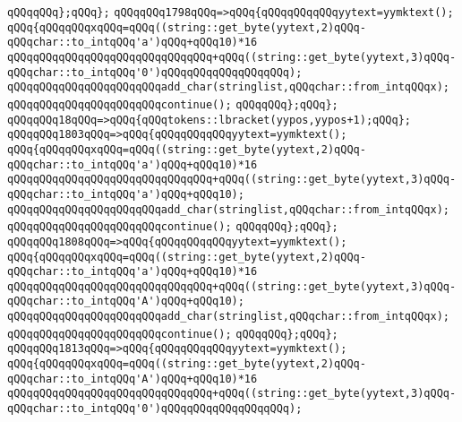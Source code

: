 \verb|qQQqqQQq};qQQq};|\newline
\verb|qQQqqQQq1798qQQq=>qQQq{qQQqqQQqqQQqyytext=yymktext();|\newline
\verb|qQQq{qQQqqQQqxqQQq=qQQq((string::get_byte(yytext,2)qQQq-qQQqchar::to_intqQQq'a')qQQq+qQQq10)*16|\newline
\verb|qQQqqQQqqQQqqQQqqQQqqQQqqQQqqQQq+qQQq((string::get_byte(yytext,3)qQQq-qQQqchar::to_intqQQq'0')qQQqqQQqqQQqqQQqqQQq);|\newline
\verb|qQQqqQQqqQQqqQQqqQQqqQQqadd_char(stringlist,qQQqchar::from_intqQQqx);|\newline
\verb|qQQqqQQqqQQqqQQqqQQqqQQqcontinue();|\newline
\verb|qQQqqQQq};qQQq};|\newline
\verb|qQQqqQQq18qQQq=>qQQq{qQQqtokens::lbracket(yypos,yypos+1);qQQq};|\newline
\verb|qQQqqQQq1803qQQq=>qQQq{qQQqqQQqqQQqyytext=yymktext();|\newline
\verb|qQQq{qQQqqQQqxqQQq=qQQq((string::get_byte(yytext,2)qQQq-qQQqchar::to_intqQQq'a')qQQq+qQQq10)*16|\newline
\verb|qQQqqQQqqQQqqQQqqQQqqQQqqQQqqQQq+qQQq((string::get_byte(yytext,3)qQQq-qQQqchar::to_intqQQq'a')qQQq+qQQq10);|\newline
\verb|qQQqqQQqqQQqqQQqqQQqqQQqadd_char(stringlist,qQQqchar::from_intqQQqx);|\newline
\verb|qQQqqQQqqQQqqQQqqQQqqQQqcontinue();|\newline
\verb|qQQqqQQq};qQQq};|\newline
\verb|qQQqqQQq1808qQQq=>qQQq{qQQqqQQqqQQqyytext=yymktext();|\newline
\verb|qQQq{qQQqqQQqxqQQq=qQQq((string::get_byte(yytext,2)qQQq-qQQqchar::to_intqQQq'a')qQQq+qQQq10)*16|\newline
\verb|qQQqqQQqqQQqqQQqqQQqqQQqqQQqqQQq+qQQq((string::get_byte(yytext,3)qQQq-qQQqchar::to_intqQQq'A')qQQq+qQQq10);|\newline
\verb|qQQqqQQqqQQqqQQqqQQqqQQqadd_char(stringlist,qQQqchar::from_intqQQqx);|\newline
\verb|qQQqqQQqqQQqqQQqqQQqqQQqcontinue();|\newline
\verb|qQQqqQQq};qQQq};|\newline
\verb|qQQqqQQq1813qQQq=>qQQq{qQQqqQQqqQQqyytext=yymktext();|\newline
\verb|qQQq{qQQqqQQqxqQQq=qQQq((string::get_byte(yytext,2)qQQq-qQQqchar::to_intqQQq'A')qQQq+qQQq10)*16|\newline
\verb|qQQqqQQqqQQqqQQqqQQqqQQqqQQqqQQq+qQQq((string::get_byte(yytext,3)qQQq-qQQqchar::to_intqQQq'0')qQQqqQQqqQQqqQQqqQQq);|\newline
